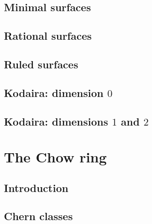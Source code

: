 \documentclass [11 pt, oneside, margin = 1 in] {article}
\begin{document}
\subsection{Minimal surfaces}
\subsection{Rational surfaces}
\subsection{Ruled surfaces}
\subsection{Kodaira: dimension $0$}
\subsection{Kodaira: dimensions $1$ and $2$}


\section{The Chow ring}
\subsection{Introduction}
\subsection{Chern classes}

\printindex
\end{document}
